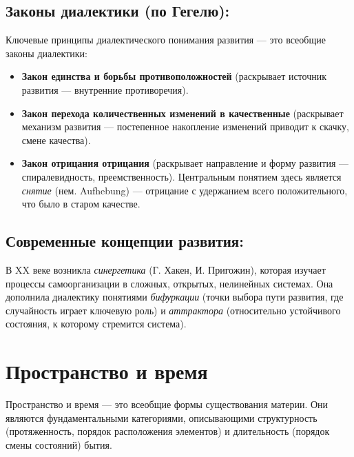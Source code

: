 \documentclass[12pt,a4paper]{article}
\begin{document}
	\subsection{Законы диалектики (по Гегелю):}
	Ключевые принципы диалектического понимания развития — это всеобщие законы диалектики:
	\begin{itemize}
		\item \textbf{Закон единства и борьбы противоположностей} (раскрывает источник развития — внутренние противоречия).
		\item \textbf{Закон перехода количественных изменений в качественные} (раскрывает механизм развития — постепенное накопление изменений приводит к скачку, смене качества).
		\item \textbf{Закон отрицания отрицания} (раскрывает направление и форму развития — спиралевидность, преемственность). Центральным понятием здесь является \textit{снятие} (нем. Aufhebung) — отрицание с удержанием всего положительного, что было в старом качестве.
	\end{itemize}
	
	\subsection{Современные концепции развития:}
	В XX веке возникла \textit{синергетика} (Г. Хакен, И. Пригожин), которая изучает процессы самоорганизации в сложных, открытых, нелинейных системах. Она дополнила диалектику понятиями \textit{бифуркации} (точки выбора пути развития, где случайность играет ключевую роль) и \textit{аттрактора} (относительно устойчивого состояния, к которому стремится система).
	
	\section{Пространство и время~\checkmark}
	
	Пространство и время — это всеобщие формы существования материи. Они являются фундаментальными категориями, описывающими структурность (протяженность, порядок расположения элементов) и длительность (порядок смены состояний) бытия.
	
\end{document}
